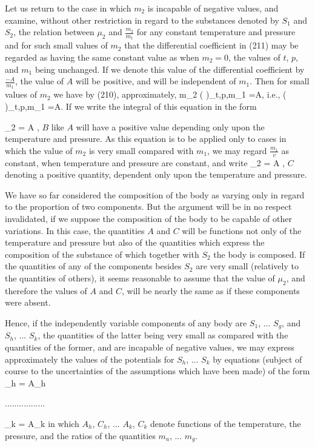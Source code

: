 \documentclass[12pt]{article}
\begin{document}
Let us return to the case in which $m_2$ is incapable of negative values, and examine, without other restriction in regard to the substances denoted by $S_1$ and $S_2$, the relation between $\mu_2$ and $\frac{m_2}{m_1}$ for any constant temperature and pressure and for such small values of $m_2$ that the differential coefficient in (211) may be regarded as having the same constant value as when $m_2=0$, the values of $t$, $p$, and $m_1$ being unchanged. If we denote this value of the differential coefficient by
$\frac{-A}{m_1}$, the value of $A$ will be positive, and will be independent of $m_1$. Then for small values of $m_2$ we have by (210), approximately,
\eqs m_2 \left(  \right)_{t,p,m_1}   =A,  \label{213}\eqe
i.e.,     
\eqs \left(  \right)_{t,p,m_1}   =A.  \label{214}\eqe
If we write the integral of this equation in the form

\eqs \mu_2 = A \log {},   \label{215}\eqe
$B$ like $A$ will have a positive value depending only upon the temperature and pressure. As this equation is to be applied only to cases in which the value of $m_2$ is very small compared with $m_1$, we may
regard $\frac{m_1}{v}$ as constant, when temperature and pressure are constant, and write 
\eqs \mu_2 = A \log {},   \label{216}\eqe
$C$ denoting a positive quantity, dependent only upon the temperature and pressure.


We have so far considered the composition of the body as varying only in regard to the proportion of two components. But the argument will be in no respect invalidated, if we suppose the composition of the body to be capable of other variations. In this case, the quantities $A$ and $C$ will be functions not only of the temperature and pressure but also of the quantities which express the composition of the substance of which together with $S_2$ the body is composed. If the quantities of any of the components besides $S_2$ are very small (relatively to the quantities of others), it seems reasonable to assume that the value of $\mu_2$, and therefore the values of $A$ and $C$, will be nearly the same as if these components were absent.


Hence, if the independently variable components of any body are $S_1$, ... $S_g$, and $S_h$, ... $S_k$, the quantities of the latter being very small as compared with the quantities of the former, and are incapable of negative values, we may express approximately the values of the potentials for $S_h$, ... $S_k$ by equations (subject of course to the uncertainties of the assumptions which have been made) of the form
\eqs \mu_h = A_h \log {}    \label{217}\eqe
\begin{center}................. \end{center}
\eqs \mu_k = A_k \log {}  \label{218}\eqe
in which $A_h$, $C_h$, ... $A_k$, $C_k$ denote functions of the temperature, the pressure, and the ratios of the quantities $m_a$, ... $m_g$.
\end{document}
